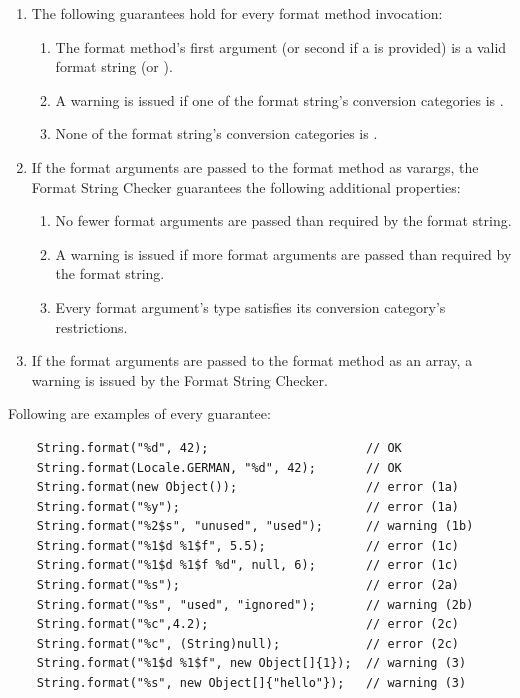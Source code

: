 \begin{enumerate}
\item
The following guarantees hold for every format method invocation:

\begin{enumerate}
    \item The format method's first argument (or second if a  is provided) is a valid
        format string (or ).

    \item A warning is issued if one of the format string's conversion categories is .
        \label{formatter-unused-category-warning}
    \item None of the format string's conversion categories is .
        \label{formatter-null-category-error}
\end{enumerate}

\item If the format arguments are passed to the format method as varargs, the
Format String Checker guarantees the following additional properties:

\begin{enumerate}
\item No fewer format arguments are passed than required by the format string.
\item A warning is issued if more format arguments are passed than required by the format string.
\item Every format argument's type satisfies its conversion category's restrictions.
\end{enumerate}

\item If the format arguments are passed to the format method as an array,
a warning is issued by the Format String Checker.
        \label{formatter-array-warning}
\end{enumerate}


\noindent Following are examples of every guarantee:

\begin{Verbatim}
    String.format("%d", 42);                      // OK
    String.format(Locale.GERMAN, "%d", 42);       // OK
    String.format(new Object());                  // error (1a)
    String.format("%y");                          // error (1a)
    String.format("%2$s", "unused", "used");      // warning (1b)
    String.format("%1$d %1$f", 5.5);              // error (1c)
    String.format("%1$d %1$f %d", null, 6);       // error (1c)
    String.format("%s");                          // error (2a)
    String.format("%s", "used", "ignored");       // warning (2b)
    String.format("%c",4.2);                      // error (2c)
    String.format("%c", (String)null);            // error (2c)
    String.format("%1$d %1$f", new Object[]{1});  // warning (3)
    String.format("%s", new Object[]{"hello"});   // warning (3)
\end{Verbatim}

